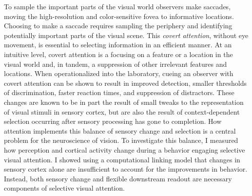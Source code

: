 To sample the important parts of the visual world observers make saccades, moving the high-resolution and color-sensitive fovea to informative locations. Choosing to make a saccade requires sampling the periphery and identifying potentially important parts of the visual scene. This \emph{covert attention}, without eye movement, is essential to selecting information in an efficient manner. At an intuitive level, covert attention is a focusing on a feature or a location in the visual world and, in tandem, a suppression of other irrelevant features and locations. When operationalized into the laboratory, cueing an observer with covert attention can be shown to result in improved detection, smaller thresholds of discrimination, faster reaction times, and suppression of distractors. These changes are known to be in part the result of small tweaks to the representation of visual stimuli in sensory cortex, but are also the result of context-dependent selection occurring after sensory processing has gone to completion. How attention implements this balance of sensory change and selection is a central problem for the neuroscience of vision. To investigate this balance, I measured how perception and cortical activity change during a behavior engaging selective visual attention. I showed using a computational linking model that changes in sensory cortex alone are insufficient to account for the improvements in behavior. Instead, both sensory change and flexible downstream readout are necessary components of selective visual attention.